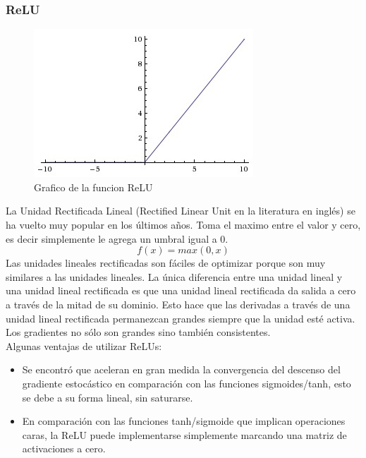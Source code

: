 \documentclass[a4paper,11pt,spanish]{book}
\begin{document}
	  \subsubsection {ReLU}
	    \begin{figure}[H]
	      \begin{center}
	       \includegraphics[width=0.4\linewidth]{./img/relu.jpeg}
	      \end{center}
	      \caption{Grafico de la funcion ReLU}
	      \label{fig:relu}
	    \end{figure}
	    La Unidad Rectificada Lineal (Rectified Linear Unit en la literatura en inglés) se ha vuelto muy popular en los últimos años. Toma el maximo entre el valor y cero, es decir
	    simplemente le agrega un umbral igual a 0.
	    \begin{equation}
	     f(x) = max(0,x)
	    \end{equation}
	    Las unidades lineales rectificadas son fáciles de optimizar porque son muy similares a las unidades lineales.
	    La única diferencia entre una unidad lineal y una unidad lineal rectificada es que una unidad lineal rectificada da salida a cero a través de la mitad de su dominio.
	    Esto hace que las derivadas a través de una unidad lineal rectificada permanezcan grandes siempre que la unidad esté activa.
	    Los gradientes no sólo son grandes sino también consistentes.\\
	    Algunas ventajas de utilizar ReLUs:
	    \begin{itemize}
	      \item Se encontró que aceleran en gran medida la convergencia del descenso del gradiente estocástico en comparación con las funciones sigmoides/tanh, esto se debe a su forma lineal, sin saturarse.
	      \item En comparación con las funciones tanh/sigmoide que implican operaciones caras, la ReLU puede implementarse simplemente marcando una matriz de activaciones a cero.
	    \end{itemize}
            
\end{document}
